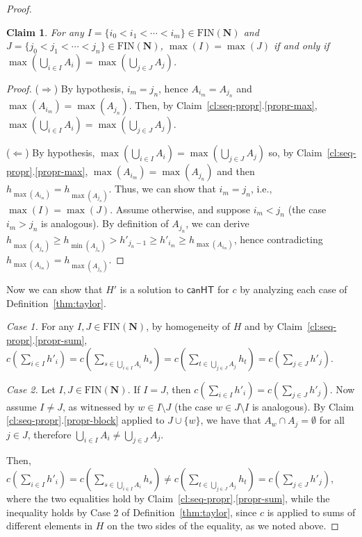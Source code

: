 \documentclass[a4paper,11pt]{article}
\newtheorem{claim}{Claim}
\newcommand\Nat{\mathbf{N}}
\newcommand\canHT{\mathsf{canHT}}
\newcommand\FIN{\mathrm{FIN}}
\begin{document}
\begin{proof}
\smallskip

\begin{claim}\label{propr:max-cons}
For any $I = \{i_0 < i_1 < \cdots < i_m\} \in \FIN(\Nat)$ and $J=\{j_0 < j_1 < \cdots < j_n\} \in \FIN(\Nat)$, $\max(I)=\max(J)$ if and only if $\max(\bigcup_{i \in I} A_i) = \max(\bigcup_{j \in J} A_j)$.
\end{claim}

\begin{proof}
($\Longrightarrow$) By hypothesis, $i_m = j_n$, hence $A_{i_m} = A_{j_n}$ and $\max(A_{i_m}) = \max(A_{j_n})$. Then, by Claim~\ref{cl:seq-propr}.\ref{propr-max}, $\max(\bigcup_{i \in I} A_i) = \max(\bigcup_{j \in J} A_j)$.

\smallskip

($\Longleftarrow$) By hypothesis, $\max(\bigcup_{i \in I} A_i) = \max(\bigcup_{j \in J} A_j)$ so, by Claim~\ref{cl:seq-propr}.\ref{propr-max}, $\max(A_{i_m}) = \max(A_{j_n})$ and then $h_{\max(A_{i_m})} = h_{\max(A_{j_n})}$. Thus, we can show that $i_m = j_n$, i.e., $\max(I) = \max(J)$. Assume otherwise, and suppose $i_m < j_n$ (the case $i_m > j_n$ is analogous). By definition of $A_{j_n}$, we can derive $h_{\max(A_{j_n})} \geq h_{\min(A_{j_n})} > h'_{j_n-1} \geq h'_{i_m} \geq h_{\max(A_{i_m})}$, hence contradicting $h_{\max(A_{i_m})} = h_{\max(A_{j_n})}$.
\end{proof}

\medskip

Now we can show that $H'$ is a solution to $\canHT$ for $c$ by analyzing each case of Definition~\ref{thm:taylor}.

\medskip

\emph{Case 1.}  For any  $I, J \in \FIN(\Nat)$, by homogeneity of $H$ and by Claim~\ref{cl:seq-propr}.\ref{propr-sum}, $c(\sum_{i \in I} h'_i) = c(\sum_{s \in \bigcup_{i \in I} A_i} h_s) = c(\sum_{t \in \bigcup_{j \in J} A_j} h_t) = c(\sum_{j \in J} h'_j)$.

\medskip

\emph{Case 2.} Let $I, J \in \FIN(\Nat)$. If $I=J$, then $c(\sum_{i \in I} h'_i) = c(\sum_{j \in J} h'_j)$. Now assume $I \neq J$, as witnessed by $w \in I \setminus J$ (the case $w \in J \setminus I$ is analogous). By Claim \ref{cl:seq-propr}.\ref{propr-block} applied to $J \cup \{w\}$, we have that $A_w \cap A_j = \emptyset$ for all $j \in J$, therefore $\bigcup_{i \in I} A_i \neq \bigcup_{j \in J} A_j$.

Then, $c(\sum_{i \in I} h'_i) = c(\sum_{s \in \bigcup_{i \in I} A_i} h_s) \neq c(\sum_{t \in \bigcup_{j \in J} A_j} h_t) = c(\sum_{j \in J} h'_j)$, where the two equalities hold by  Claim~\ref{cl:seq-propr}.\ref{propr-sum}, while the inequality holds by Case 2 of Definition~\ref{thm:taylor}, since $c$ is applied to sums of different elements in $H$ on the two sides of the equality, as we noted above.


\end{proof}
\end{document}
